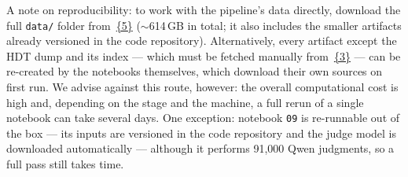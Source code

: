 \documentclass{article}
\begin{document}
\noindent A note on reproducibility: to work with the pipeline's data directly, download the full \texttt{data/} folder from~\href{https://drive.google.com/drive/folders/1RlQuowaWmVF0fe2fcAqVBBaT4dmsnU7s}{\{5\}} ($\sim$614\,GB in total; it also includes the smaller artifacts already versioned in the code repository). Alternatively, every artifact except the HDT dump and its index --- which must be fetched manually from~\href{https://hdt-dumps.cluster.ai.wu.ac.at/dumps/}{\{3\}} --- can be re-created by the notebooks themselves, which download their own sources on first run. We advise against this route, however: the overall computational cost is high and, depending on the stage and the machine, a full rerun of a single notebook can take several days. One exception: notebook \texttt{09} is re-runnable out of the box --- its inputs are versioned in the code repository and the judge model is downloaded automatically --- although it performs 91{,}000 Qwen judgments, so a full pass still takes time.
\end{document}
